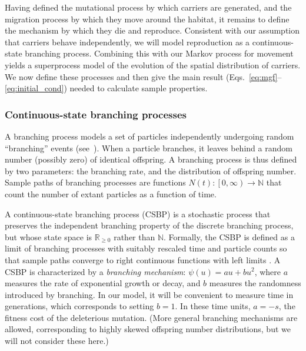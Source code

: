 \documentclass{article}
\begin{document}
Having defined the mutational process by which carriers are generated, and the migration process by which they move around the habitat, it remains to define the mechanism by which they die and reproduce.
Consistent with our assumption that carriers behave independently, we will model reproduction as a continuous-state branching process.
Combining this with our Markov process for movement yields a superprocess model of the evolution of the spatial distribution of carriers.
We now define these processes and then give the main result (Eqs.~\ref{eq:mgf}--\ref{eq:initial_cond}) needed to calculate sample properties.

\subsubsection*{Continuous-state branching processes}


A branching process models a set of particles independently undergoing random ``branching'' events (see~\cite{GrimmettStirzaker:1992}).
When a particle branches, it leaves behind a random number (possibly zero) of identical offspring.
A branching process is thus defined by two parameters: the branching rate, and the distribution of offspring number.
Sample paths of branching processes are functions $N(t):\left[0, \infty\right) \rightarrow \mathbb{N}$ that count the number of extant particles as a function of time.

A continuous-state branching process (CSBP) is a stochastic process that preserves the independent branching property of the discrete branching process, but whose state space is $\mathbb{R}_{\ge 0}$ rather than $\mathbb{N}$.
Formally, the CSBP is defined as a limit of branching processes with suitably rescaled time and particle counts so that sample paths converge to right continuous functions with left limits \cite{Lamperti}.
A CSBP is characterized by a \emph{branching mechanism}:
    $\psi(u) = a u + b u^2$,
where $a$ measures the rate of exponential growth or decay, and $b$ measures the randomness introduced by branching.
In our model, it will be convenient to measure time in generations, which corresponds to setting $b=1$.
In these time units, $a=-s$, the fitness cost of the deleterious mutation.
(More general branching mechanisms are allowed, corresponding to highly skewed offspring number distributions, but we will not consider these here.)
\end{document}
